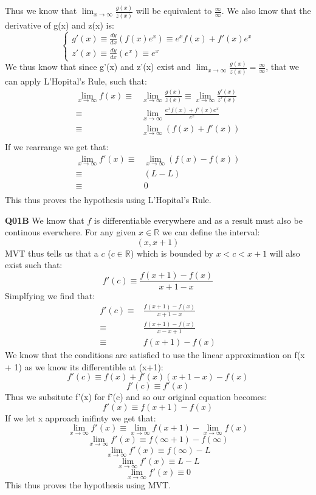 \documentclass[11pt]{article}
\begin{document}
Thus we know that $ \displaystyle{\lim_{x \to \infty}} \frac{g(x)}{z(x)}$ will be equivalent to $\frac{\infty}{\infty}$. We also know that the derivative of g(x) and z(x) is:
$$
\begin{cases}
g'(x) \equiv \frac{dy}{dx}(f(x)e^x) \equiv e^xf(x) + f'(x)e^x\\
z'(x) \equiv\frac{dy}{dx}(e^x) \equiv e^x
\end{cases}
$$
We thus know that since g'(x) and z'(x) exist and $ \displaystyle{\lim_{x \to \infty}} \frac{g(x)}{z(x)} = \frac{\infty}{\infty}$, that we can apply L’Hopital’s Rule, such that:
\begin{align*} 
  \lim_{x \to \infty} f(x) \equiv & \lim_{x \to \infty} \frac{g(x)}{z(x)} \equiv \lim_{x \to \infty} \frac{g'(x)}{z'(x)}   \\
                                      \equiv & \lim_{x \to \infty} \frac{e^xf(x) + f'(x)e^x}{e^x}\\
                                      \equiv & \lim_{x \to \infty} (f(x) + f'(x))\\
\end{align*}
If we rearrange we get that:
\begin{align*} 
  \lim_{x \to \infty} f'(x) \equiv & \lim_{x \to \infty} (f(x) - f(x))\\
                                       \equiv &  (L - L)\\
                                       \equiv & 0\\
\end{align*}
This thus proves the hypothesis using L’Hopital’s Rule.

\textbf{Q01B} We know that $f$ is differentiable everywhere and as a result must also be continous everwhere. For any given $x \in \mathbb{R}$ we can define the interval:
\[ (x, x+1) \]
MVT thus tells us that a $c$ ($c \in \mathbb{R}$) which is bounded by $x < c < x+1$  will also exist such that:
\[ f'(c) \equiv \frac{f(x+1) - f(x)}{x+1 - x}\]
Simplfying we find that:
\begin{align*} 
 f'(c) \equiv & \frac{f(x+1) - f(x)}{x+1 - x} \\
        \equiv & \frac{f(x+1) - f(x)}{x- x + 1} \\
        \equiv & f(x+1) - f(x)
\end{align*}
We know that the conditions are satisfied to use the linear approximation on f(x + 1) as we know its differentible at (x+1):
\[ f'(c) \equiv f(x) + f'(x)(x+1-x) - f(x) \]
\[f'(c) \equiv f'(x)\]
Thus we subsitute f'(x) for f'(c) and so our original equation becomes:
\[ f'(x) \equiv f(x+1) - f(x) \]
If we let x approach inifinty we get that:
\[ \displaystyle{\lim_{x \to \infty}} f'(x) \equiv \displaystyle{\lim_{x \to \infty}} f(x+1) - \displaystyle{\lim_{x \to \infty}} f(x) \]
\[ \displaystyle{\lim_{x \to \infty}} f'(x) \equiv  f(\infty+1) -  f(\infty) \]
\[ \displaystyle{\lim_{x \to \infty}} f'(x) \equiv  f(\infty) -  L \]
\[ \displaystyle{\lim_{x \to \infty}} f'(x) \equiv  L -  L \]
\[ \displaystyle{\lim_{x \to \infty}} f'(x) \equiv  0 \]
This thus proves the hypothesis using MVT.
\end{document}
